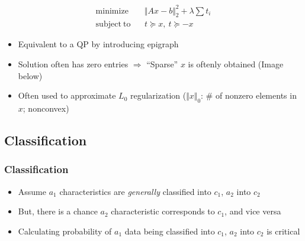 \begin{itemize}
\begin{equation}
\begin{aligned}
        \mathrm{minimize}~~&~~\Vert Ax-b\Vert_2^2+\lambda\sum t_i \\
        \mathrm{subject~to}~~&~~t\succeq x,~t\succeq -x
    \end{aligned}\end{equation}
    \begin{itemize}
        \item Equivalent to a QP by introducing epigraph
        \item Solution often has zero entries $\Rightarrow$ ``Sparse'' $x$ is oftenly obtained (Image below)
        \item Often used to approximate $L_0$ regularization ($\Vert x\Vert_0$: \# of nonzero elements in $x$; nonconvex)
    \end{itemize}
    \begin{figures}
    \end{figures}
\end{itemize}

\subsection{Classification}

\subsubsection*{Classification}
\begin{itemize}
    \item Assume $a_1$ characteristics are \textit{generally} classified into $c_1$, $a_2$ into $c_2$
    \item But, there is a chance $a_2$ characteristic corresponds to $c_1$, and vice versa
    \item Calculating probability of $a_1$ data being classified into $c_1$, $a_2$ into $c_2$ is critical
\end{itemize}

